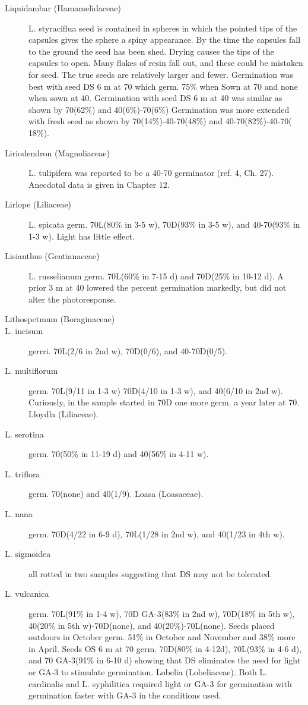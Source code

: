 \begin{description}
\item[Liquidambar (Hamamelidaceae)] L. styraciflua seed is contained in
spheres in which the pointed tips of the capsules gives the sphere a spiny
appearance. By the time the capsules fall to the ground the seed has been shed.
Drying causes the tips of the capsules to open. Many flakes of resin fall out, and these
could be mistaken for seed. The true seeds are relatively larger and fewer.
Germination was best with seed DS 6 m at 70 which germ. 75\% when Sown at 70 and
none when sown at 40. Germination with seed DS 6 m at 40 was similar as shown by
70(62\%) and 40(6\%)-70(6\%) Germination was more extended with fresh seed as
shown by 70(14\%)-40-70(48\%) and 40-70(82\%)-40-70( 18\%).
\item[Liriodendron (Magnoliaceae)] L. tulipifera was reported to be a 40-70
germinator (ref. 4, Ch. 27). Anecdotal data is given in Chapter 12.
\item[Lirlope (Liliaceae)] L. spicata germ. 70L(80\% in 3-5 w), 70D(93\% in 3-5 w),
and 40-70(93\% in 1-3 w). Light has little effect.

\item[Lisianthus (Gentianaceae)] L. rus\-selianum germ. 70L(60\% in 7-15 d) and
70D(25\% in 10-12 d). A prior 3 m at 40 lowered the percent germination markedly, but
did not alter the photoresponse.

\item[Lithospetmum (Boraginaceae)]
\item[L. incisum] gerrri. 70L(2/6 in 2nd w), 70D(0/6), and 40-70D(0/5).
\item[L. multiflorum] germ. 70L(9/11 in 1-3 w) 70D(4/10 in 1-3 w), and 40(6/10 in 2nd
w). Curiously, in the sample started in 70D one more germ. a year later at 70.
Lloydla (Liliaceae).
\item[L. serotina] germ. 70(50\% in 11-19 d) and 40(56\% in 4-11 w).
\item[L. triflora] germ. 70(none) and 40(1/9).
Loasa (Loasaceae).
\item[L. nana] germ. 70D(4/22 in 6-9 d), 70L(1/28 in 2nd w), and 40(1/23 in 4th w).
\item[L. sigmoidea] all rotted in two samples suggesting that DS may not be tolerated.
\item[L. vulcanica] germ. 70L(91\% in 1-4 w), 70D GA-3(83\% in 2nd w), 70D(18\% in
5th w), 40(20\% in 5th w)-70D(none), and 40(20\%)-70L(none). Seeds placed outdoors
in October germ. 51\% in October and November and 38\% more in April. Seeds OS 6
m at 70 germ. 70D(80\% in 4-12d), 70L(93\% in 4-6 d), and 70 GA-3(91\% in 6-10 d)
showing that DS eliminates the need for light or GA-3 to stimulate germination.
Lobelia (Lobeliaceae). Both L. cardinalis and L. syphilitica required light or
GA-3 for germination with germination faster with GA-3 in the conditions used.


\end{description}

